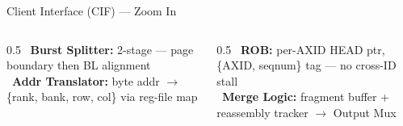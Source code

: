\documentclass[aspectratio=169,10pt]{beamer}
\begin{document}
\begin{frame}{Client Interface (CIF) — Zoom In}
  \vspace*{2pt}
  \begin{columns}[T,totalwidth=\linewidth]
    \scriptsize
    \begin{column}{0.5\linewidth}
      \textbullet\ \textbf{Burst Splitter:} 2-stage — page boundary then BL alignment\\[2pt]
      \textbullet\ \textbf{Addr Translator:} byte addr $\to$ \{rank, bank, row, col\} via reg-file map
    \end{column}
    \begin{column}{0.5\linewidth}
      \textbullet\ \textbf{ROB:} per-AXID HEAD ptr, \{AXID, seqnum\} tag — no cross-ID stall\\[2pt]
      \textbullet\ \textbf{Merge Logic:} fragment buffer + reassembly tracker $\to$ Output Mux
    \end{column}
  \end{columns}
\end{frame}
\end{document}
